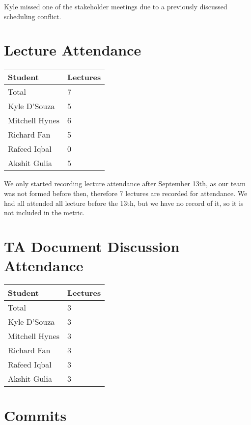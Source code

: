 \documentclass{article}
\begin{document}
Kyle missed one of the stakeholder meetings due to a previously
discussed scheduling conflict.

\section{Lecture Attendance}

\begin{table}[H]
  \centering
  \begin{tabular}{ll}
    \toprule
    \textbf{Student} & \textbf{Lectures}\\
    \midrule
    Total & 7\\
    Kyle D'Souza & 5\\
    Mitchell Hynes & 6\\
    Richard Fan & 5\\
    Rafeed Iqbal & 0\\
    Akshit Gulia & 5\\
    \bottomrule
  \end{tabular}
\end{table}

We only started recording lecture attendance after September 13th, as
our team was not formed before then, therefore 7 lectures are
recorded for attendance. We had all attended all lecture before the
13th, but we have no record of it, so it is not included in the metric.

\section{TA Document Discussion Attendance}

\begin{table}[H]
  \centering
  \begin{tabular}{ll}
    \toprule
    \textbf{Student} & \textbf{Lectures}\\
    \midrule
    Total & 3\\
    Kyle D'Souza & 3\\
    Mitchell Hynes & 3\\
    Richard Fan & 3\\
    Rafeed Iqbal & 3\\
    Akshit Gulia & 3\\
    \bottomrule
  \end{tabular}
\end{table}

\section{Commits}
\end{document}
